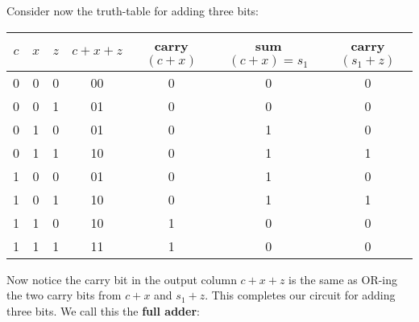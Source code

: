 \documentclass[main.tex]{subfiles}
\begin{document}
Consider now the truth-table for adding three bits:
\begin{center}
	\begin{tabular}{ccc|c|ccc}
		\(c\) & \(x\) & \(z\) & \(c+x+z\) & carry\((c+x)\)  & sum\((c+x) = s_1\) & carry\((s_1+z)\) \\
		\midrule
		0 & 0 & 0 & 00 & 0 & 0 & 0 \\
		0 & 0 & 1 & 01 & 0 & 0 & 0 \\
		0 & 1 & 0 & 01 & 0 & 1 & 0 \\
		0 & 1 & 1 & 10 & 0 & 1 & 1 \\
		1 & 0 & 0 & 01 & 0 & 1 & 0 \\
		1 & 0 & 1 & 10 & 0 & 1 & 1 \\
		1 & 1 & 0 & 10 & 1 & 0 & 0 \\
		1 & 1 & 1 & 11 & 1 & 0 & 0 \\
	\end{tabular}
\end{center}

Now notice the carry bit in the output column \(c+x+z\) is the same as OR-ing the two carry bits from \(c+x\) and \(s_1+z\). This completes our circuit for adding three bits. We call this the \textbf{full adder}:
\end{document}
